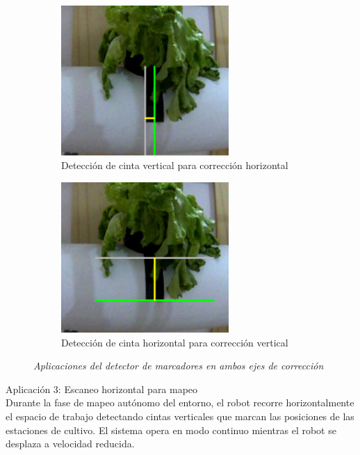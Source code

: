 \begin{figure}[H]
\centering
\begin{subfigure}[b]{0.48\textwidth}
    \centering
    \includegraphics[width=0.7\textwidth]{imagenes/detector_marcadores_5_lineas_verticales.png}
    \caption{Detección de cinta vertical para corrección horizontal}
\end{subfigure}
\hfill
\begin{subfigure}[b]{0.48\textwidth}
    \centering
    \includegraphics[width=0.7\textwidth]{imagenes/detector_marcadores_5_lineas_horizontales.png}
    \caption{Detección de cinta horizontal para corrección vertical}
\end{subfigure}
\caption{\textit{Aplicaciones del detector de marcadores en ambos ejes de corrección}}
\label{fig:aplicaciones_marcadores}
\end{figure}

Aplicación 3: Escaneo horizontal para mapeo\\
\noindent
Durante la fase de mapeo autónomo del entorno, el robot recorre horizontalmente el espacio de trabajo detectando cintas verticales que marcan las posiciones de las estaciones de cultivo. El sistema opera en modo continuo mientras el robot se desplaza a velocidad reducida.

